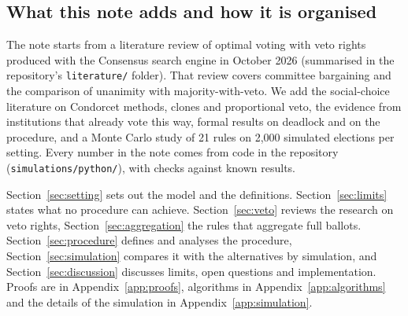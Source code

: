 \subsection{What this note adds and how it is organised}

The note starts from a literature review of optimal voting with veto rights produced with the
Consensus search engine in October 2026 (summarised in the repository's \texttt{literature/} folder). That
review covers committee bargaining and the comparison of unanimity with majority-with-veto. We add the
social-choice literature on Condorcet methods, clones and proportional veto, the evidence from
institutions that already vote this way, formal results on deadlock and on the procedure, and a Monte
Carlo study of 21 rules on 2,000 simulated elections per setting. Every number in the note comes from
code in the repository (\texttt{simulations/python/}), with checks against known results.

Section~\ref{sec:setting} sets out the model and the definitions. Section~\ref{sec:limits} states what
no procedure can achieve. Section~\ref{sec:veto} reviews the research on veto rights,
Section~\ref{sec:aggregation} the rules that aggregate full ballots. Section~\ref{sec:procedure} defines
and analyses the procedure, Section~\ref{sec:simulation} compares it with the alternatives by
simulation, and Section~\ref{sec:discussion} discusses limits, open questions and implementation.
Proofs are in Appendix~\ref{app:proofs}, algorithms in Appendix~\ref{app:algorithms} and the details of
the simulation in Appendix~\ref{app:simulation}.
